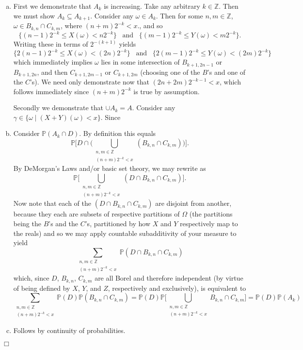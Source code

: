 \documentclass{article}
\begin{document}
\begin{enumerate}[(a)]

\item First we demonstrate that $A_k$ is increasing. Take any arbitrary $k \in \mathbb{Z}$. Then we must show $A_k \subseteq A_{k + 1}$. Consider any $\omega \in A_k$. Then for some $n,m \in \mathbb{Z}$, $\omega \in B_{k,n} \cap C_{k,m}$, where $(n + m)2^{-k} < x$., and so \[\{(n-1) 2^{-k} \leq X(\omega) < n 2^{-k}\} \;\;\; \text{and} \;\;\; \{(m-1) 2^{-k} \leq Y(\omega) < m 2^{-k}\}.\] Writing these in terms of $2^{-(k + 1)}$ yields \[\{2(n-1) 2^{-k} \leq X(\omega) < (2n) 2^{-k}\} \;\;\; \text{and} \;\;\; \{2(m-1) 2^{-k} \leq Y(\omega) < (2m) 2^{-k}\}\] which immediately implies $\omega$ lies in some intersection of $B_{k+1,2n-1}$ or $B_{k+1,2n}$, and then $C_{k+1,2m-1}$ or $C_{k+1,2m}$ (choosing one of the $B$'s and one of the $C$'s). We need only demonstrate now that $(2n + 2m) 2^{-k - 1} < x$, which follows immediately since $(n + m) 2^{-k}$ is true by assumption. 

Secondly we demonstrate that $\cup A_k = A$. Consider any $\gamma \in \{\omega \mid (X+Y)(\omega) < x\}$. Since 


\item Consider $\mathbb{P}(A_k \cap D)$. By definition this equals  \[\mathbb{P}\Bigg[ D \cap \Big( \bigcup_{\substack{n,m \in \mathbb{Z} \\ (n+m)2^{-k} < x}} (B_{k,n} \cap C_{k,m}) \Big) \Bigg].\] By DeMorgan's Laws and/or basic set theory, we may rewrite as \[\mathbb{P}\Bigg[ \bigcup_{\substack{n,m \in \mathbb{Z} \\ (n+m)2^{-k} < x}} (D \cap B_{k,n} \cap C_{k,m}) \Bigg].\] Now note that each of the $(D \cap B_{k,n} \cap C_{k,m})$ are disjoint from another, because they each are subsets of respective partitions of $\Omega$ (the partitions being the $B$'s and the $C$'s, partitioned by how $X$ and $Y$ respectively map to the reals) and so we may apply countable subadditivity of your measure to yield  \[\sum_{\substack{n,m \in \mathbb{Z} \\ (n+m)2^{-k} < x}} \mathbb{P}(D \cap B_{k,n} \cap C_{k,m})\] which, since $D$, $B_{k,n}$, $C_{k,m}$ are all Borel and therefore independent (by virtue of being defined by $X$, $Y$, and $Z$, respectively and exclusively), is equivalent to \[\sum_{\substack{n,m \in \mathbb{Z} \\ (n+m)2^{-k} < x}} \mathbb{P}(D) \mathbb{P}(B_{k,n} \cap C_{k,m}) = \mathbb{P}(D) \mathbb{P} \Big[\bigcup_{\substack{n,m \in \mathbb{Z} \\ (n+m)2^{-k} < x}} B_{k,n} \cap C_{k,m} \Big] = \mathbb{P}(D) \mathbb{P}(A_k)\]

\item Follows by continuity of probabilities.  

\end{enumerate}

\hfill $\Box$
\end{document}
